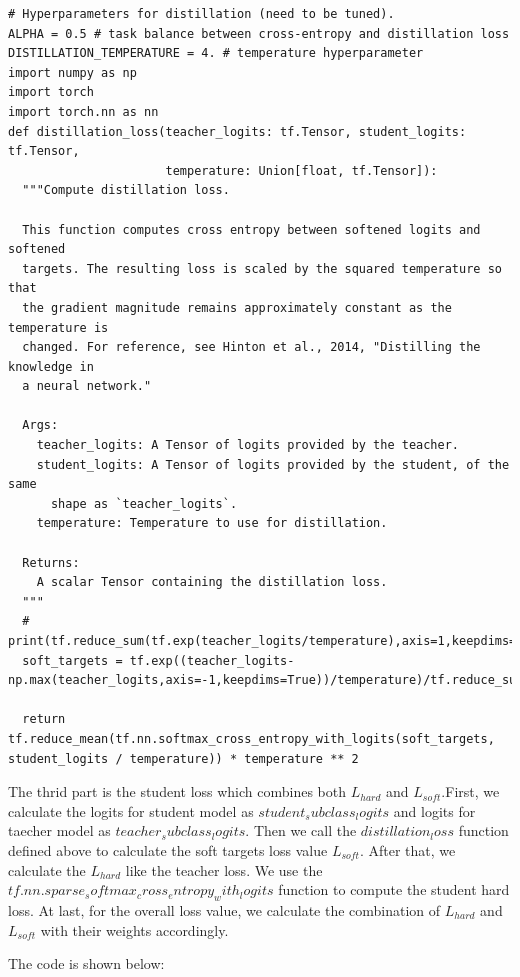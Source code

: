 \documentclass[conference]{IEEEtran}
\begin{document}
\begin{lstlisting}
# Hyperparameters for distillation (need to be tuned).
ALPHA = 0.5 # task balance between cross-entropy and distillation loss
DISTILLATION_TEMPERATURE = 4. # temperature hyperparameter
import numpy as np
import torch
import torch.nn as nn
def distillation_loss(teacher_logits: tf.Tensor, student_logits: tf.Tensor,
                      temperature: Union[float, tf.Tensor]):
  """Compute distillation loss.

  This function computes cross entropy between softened logits and softened
  targets. The resulting loss is scaled by the squared temperature so that
  the gradient magnitude remains approximately constant as the temperature is
  changed. For reference, see Hinton et al., 2014, "Distilling the knowledge in
  a neural network."

  Args:
    teacher_logits: A Tensor of logits provided by the teacher.
    student_logits: A Tensor of logits provided by the student, of the same
      shape as `teacher_logits`.
    temperature: Temperature to use for distillation.

  Returns:
    A scalar Tensor containing the distillation loss.
  """
  # print(tf.reduce_sum(tf.exp(teacher_logits/temperature),axis=1,keepdims=True).shape)
  soft_targets = tf.exp((teacher_logits-np.max(teacher_logits,axis=-1,keepdims=True))/temperature)/tf.reduce_sum(tf.exp(np.max(teacher_logits,axis=-1,keepdims=True)/temperature),axis=1,keepdims=True)

  return tf.reduce_mean(tf.nn.softmax_cross_entropy_with_logits(soft_targets, student_logits / temperature)) * temperature ** 2

\end{lstlisting}
The thrid part is the student loss which combines both $L_{hard}$ and $L_{soft}$.First, we calculate the logits for student model as $student_subclass_logits$ and logits for taecher model as $teacher_subclass_logits$.
Then we call the $distillation_loss$ function defined above to calculate the soft targets loss value $L_{soft}$.
After that, we calculate the $L_{hard}$ like the teacher loss. We use the $tf.nn.sparse_softmax_cross_entropy_with_logits$ function to compute the student hard loss.
At last, for the overall loss value, we calculate the combination of $L_{hard}$ and $L_{soft}$ with their weights accordingly.\par
The code is shown below:
\end{document}
